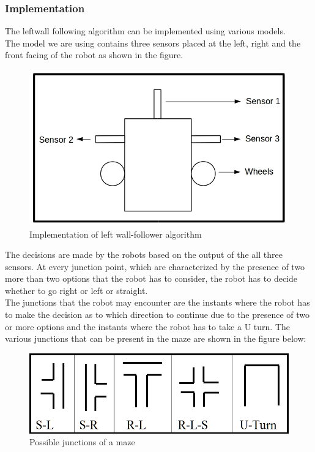 \subsubsection{Implementation}
The leftwall following algorithm can be implemented using various models.\\ 
The model we are using contains three sensors placed at the left, right and the front facing of the robot as shown in the figure.
\begin{figure}[h]
\center
\includegraphics[scale=0.5]{bot.jpg}  
\caption{Implementation of left wall-follower algorithm}
\end{figure}
\justify The decisions are made by the robots based on the output of the all three sensors. At every junction point, which are characterized by the presence of two more than two options that the robot has to consider, the robot has to decide whether to go right or left or straight.\\
The junctions that the robot may encounter are the instants where the robot has to make the decision as to which direction to continue due to the presence of two or more options and the instants where the robot has to take a U turn. The various junctions that can be present in the maze are shown in the figure below:\begin{figure}[h]
\center
\includegraphics[scale=0.7]{Capture4.PNG} 
\caption{Possible junctions of a maze}
\end{figure}
